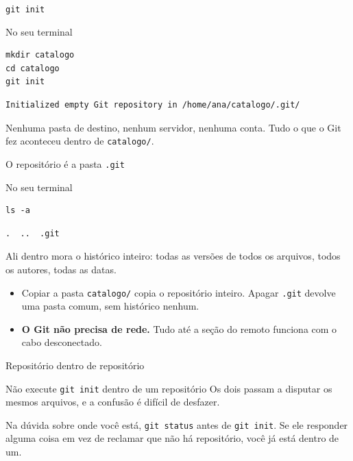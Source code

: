 \documentclass{beamer}
\newenvironment{noterminal}
  {\begin{exampleblock}{No seu terminal}}
  {\end{exampleblock}}
\begin{document}
\begin{frame}[fragile]{\texttt{git init}}
  \begin{noterminal}
    \begin{verbatim}
mkdir catalogo
cd catalogo
git init
    \end{verbatim}
  \end{noterminal}

  \begin{verbatim}
Initialized empty Git repository in /home/ana/catalogo/.git/
  \end{verbatim}

  Nenhuma pasta de destino, nenhum servidor, nenhuma conta. Tudo o que o Git fez
  aconteceu dentro de \texttt{catalogo/}.
\end{frame}

\begin{frame}[fragile]{O repositório é a pasta \texttt{.git}}
  \begin{noterminal}
    \begin{verbatim}
ls -a
    \end{verbatim}
  \end{noterminal}

  \begin{verbatim}
.  ..  .git
  \end{verbatim}

  Ali dentro mora o histórico inteiro: todas as versões de todos os arquivos,
  todos os autores, todas as datas.

  \begin{itemize}
    \item Copiar a pasta \texttt{catalogo/} copia o repositório inteiro. Apagar
          \texttt{.git} devolve uma pasta comum, sem histórico nenhum.
    \item \textbf{O Git não precisa de rede.} Tudo até a seção do remoto
          funciona com o cabo desconectado.
  \end{itemize}
\end{frame}

\begin{frame}{Repositório dentro de repositório}
  \begin{alertblock}{Não execute \texttt{git init} dentro de um repositório}
    Os dois passam a disputar os mesmos arquivos, e a confusão é difícil de
    desfazer.
  \end{alertblock}

  \vspace{0.5cm}
  Na dúvida sobre onde você está, \texttt{git status} antes de \texttt{git
  init}. Se ele responder alguma coisa em vez de reclamar que não há
  repositório, você já está dentro de um.
\end{frame}
\end{document}

